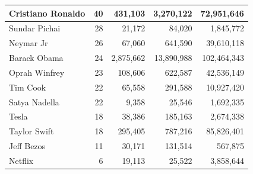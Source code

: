 \documentclass[oneside,openright,12pt]{ufsm_2015} %
\begin{document}
\begin{table}[ht]
\begin{tabular}{|l|r|r|r|r|}
    Cristiano Ronaldo	& 40	& 431,103	& 3,270,122	& 72,951,646 	\\ \hline
    Sundar Pichai		& 28	& 21,172	& 84,020	& 1,845,772 	\\ \hline
    Neymar Jr			& 26	& 67,060	& 641,590	& 39,610,118 	\\ \hline
    Barack Obama		& 24	& 2,875,662	& 13,890,988& 102,464,343   \\ \hline
    Oprah Winfrey		& 23	& 108,606	& 622,587	& 42,536,149 	\\ \hline
    Tim Cook			& 22	& 65,558	& 291,588	& 10,927,420 	\\ \hline
    Satya Nadella		& 22	& 9,358		& 25,546	& 1,692,335 	\\ \hline
    Tesla				& 18	& 38,386	& 185,163	& 2,674,338 	\\ \hline
    Taylor Swift		& 18	& 295,405	& 787,216	& 85,826,401 	\\ \hline
    Jeff Bezos			& 11	& 30,171	& 131,514	& 567,875 	    \\ \hline
    Netflix				& 6		& 19,113	& 25,522	& 3,858,644 	\\ \hline
    \end{tabular}
    \end{table}
\end{document}
